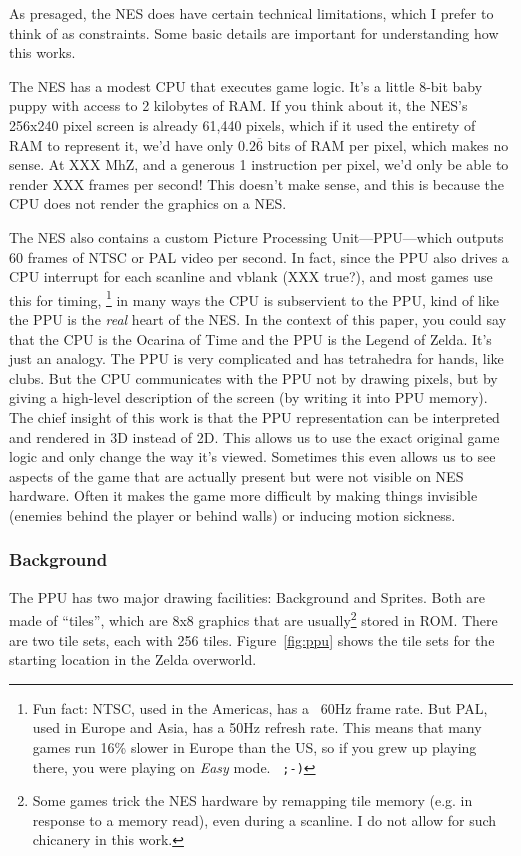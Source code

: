 \documentclass[twocolumn]{article}
\begin{document}
As presaged, the NES does have certain technical limitations, which I
prefer to think of as constraints. Some basic details are important
for understanding how this works.

The NES has a modest CPU that executes game logic. It's a little 8-bit
baby puppy with access to 2 kilobytes of RAM. If you think about it,
the NES's 256x240 pixel screen is already 61,440 pixels, which if it
used the entirety of RAM to represent it, we'd have only
$0.2\overline{6}$ bits of RAM per pixel, which makes no sense. At XXX
MhZ, and a generous 1 instruction per pixel, we'd only be able to render
XXX frames per second! This doesn't make sense, and this is because
the CPU does not render the graphics on a NES.

The NES also contains a custom Picture Processing Unit---PPU---which
outputs 60 frames of NTSC or PAL video per second. In fact, since the
PPU also drives a CPU interrupt for each scanline and vblank (XXX
true?), and most games use this for timing,%
%
\footnote{Fun fact: NTSC, used in the Americas, has a ~60Hz frame
  rate. But PAL, used in Europe and Asia, has a 50Hz refresh rate.
  This means that many games run 16\% slower in Europe than the US, so
  if you grew up playing there, you were playing on {\em Easy} mode.
  {\tt\ ;-)}}
%
in many ways the CPU is subservient to the PPU, kind of like the PPU
is the {\it real} heart of the NES. In the context of this paper, you
could say that the CPU is the Ocarina of Time and the PPU is the
Legend of Zelda. It's just an analogy. The PPU is very complicated and
has tetrahedra for hands, like clubs. But the CPU communicates with
the PPU not by drawing pixels, but by giving a high-level description
of the screen (by writing it into PPU memory). The chief insight of
this work is that the PPU representation can be interpreted and
rendered in 3D instead of 2D. This allows us to use the exact original
game logic and only change the way it's viewed. Sometimes this even
allows us to see aspects of the game that are actually present but
were not visible on NES hardware. Often it makes the game more
difficult by making things invisible (enemies behind the player or
behind walls) or inducing motion sickness.

\subsubsection{Background}
The PPU has two major drawing facilities: Background and Sprites. Both
are made of ``tiles'', which are 8x8 graphics that are
usually\footnote{Some games trick the NES hardware by remapping tile
memory (e.g. in response to a memory read), even during a scanline. I
do not allow for such chicanery in this work.} stored in ROM. There
are two tile sets, each with 256 tiles. Figure~\ref{fig:ppu} shows the
tile sets for the starting location in the Zelda overworld.
\end{document}
